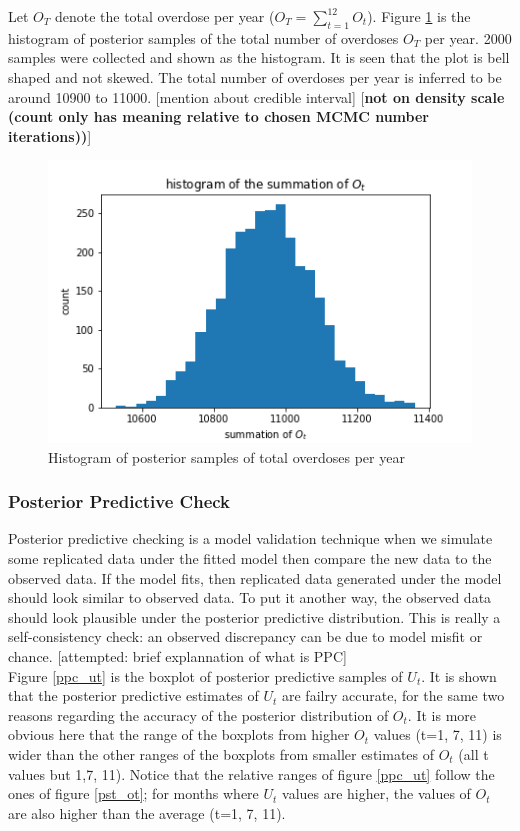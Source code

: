 \documentclass[12pt]{article}
\begin{document}
Let $O_T$ denote the total overdose per year ($O_T = \sum_{t=1}^{12}O_t $). Figure \ref{hst_ot} is the histogram of posterior samples of the total number of overdoses $O_T$ per year. 2000 samples were collected and shown as the histogram.  It is seen that the plot is bell shaped and not skewed. The total number of overdoses per year is inferred to be around 10900 to 11000. [mention about credible interval] [\textbf{not on density scale (count only has meaning relative to chosen MCMC number iterations))}]\\

\begin{figure}[h]
	\centering
	\includegraphics[width=1\linewidth]{Figures/hist_sum_ot.png}
	\caption{Histogram of posterior samples of total overdoses per year}
	\label{hst_ot}
\end{figure}

\newpage
\subsubsection{Posterior Predictive Check}
Posterior predictive checking is a model validation technique when we simulate some replicated data under the fitted model then compare the new data to the observed data. If the model fits, then replicated data generated under the model should look similar to observed data. To put it another way, the observed data should look plausible under the posterior predictive distribution. This is really a self-consistency check: an observed discrepancy can be due to model misfit or chance. \cite{bda_galman}
[attempted: brief explannation of what is PPC]\\

Figure \ref{ppc_ut} is the boxplot of posterior predictive samples of $U_t$. It is shown that the posterior predictive estimates of $U_t$ are failry accurate, for the same two reasons regarding the accuracy of the posterior distribution of $O_t$. It is more obvious here that the range of the boxplots from higher $O_t$ values (t=1, 7, 11) is wider than the other ranges of the boxplots from smaller estimates of $O_t$ (all t values but 1,7, 11). Notice that the relative ranges of figure \ref{ppc_ut} follow the ones of figure \ref{pst_ot}; for months where $U_t$ values are higher, the values of $O_t$ are also higher than the average (t=1, 7, 11).\\
\end{document}
